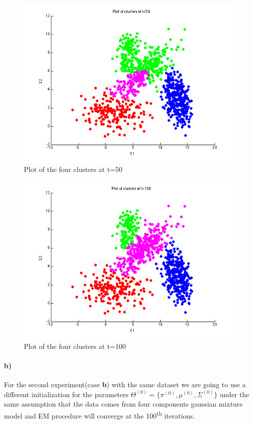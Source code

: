\documentclass[a4paper]{article}
\begin{document}
\begin{figure}[H]
  \centering
    \includegraphics[scale=.57]{images/clusters_t_50.png}
  \caption{Plot of the four clusters at t=50}
\end{figure}

\begin{figure}[H]
  \centering
    \includegraphics[scale=.57]{images/clusters_t_100.png}
  \caption{Plot of the four clusters at t=100}
\end{figure}

\paragraph{b) } For the second experiment(case \textbf{b}) with the same dataset we are going to use a different initialization for the parameters $\Theta^{(0)} = \{ \pi^{(0)}, \mu^{(0)}, \Sigma^{(0)} \}$ under the same assumption that the data comes from	four components gaussian mixture model and EM procedure will converge at the 100\textsuperscript{th} iterations.\\
\end{document}
